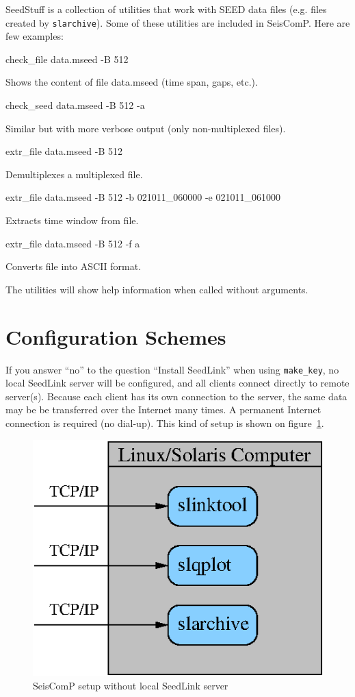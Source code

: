 \documentclass[11pt,a4paper,titlepage]{article}
\begin{document}
SeedStuff is a collection of utilities that work with SEED data files
(e.g. files created by \verb+slarchive+). Some of these utilities are
included in SeisComP. Here are few examples:
\begin{interface}
\item check_file data.mseed -B 512

Shows the content of file data.mseed (time span, gaps, etc.).

\item check_seed data.mseed -B 512 -a

Similar but with more verbose output (only non-multiplexed files).

\item extr_file data.mseed -B 512

Demultiplexes a multiplexed file.

\item extr_file data.mseed -B 512 -b 021011_060000 -e 021011_061000

Extracts time window from file.

\item extr_file data.mseed -B 512 -f a

Converts file into ASCII format.
\end{interface}

The utilities will show help information when called without arguments.


\section{Configuration Schemes}\label{schemes}

If you answer ``no'' to the question ``Install SeedLink'' when using
\verb+make_key+, no local SeedLink server will be configured, and all
clients connect directly to remote server(s). Because each client has its
own connection to the server, the same data may be be transferred over the
Internet many times. A permanent Internet connection is required (no
dial-up). This kind of setup is shown on figure~\ref{scheme1}.

\begin{figure}[p!]
\centering
\includegraphics{scheme1.eps}
\caption{SeisComP setup without local SeedLink server} \label{scheme1}
\end{figure}
\end{document}
